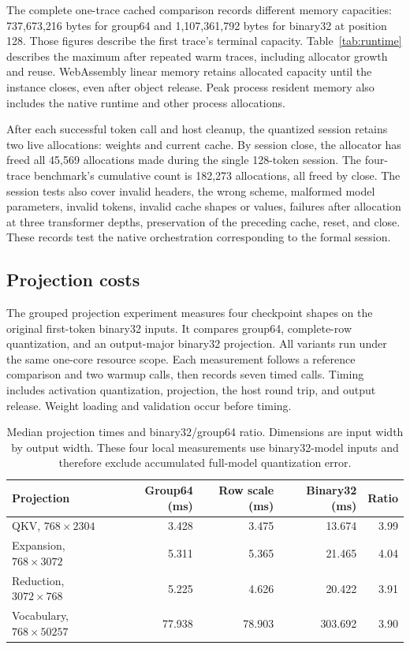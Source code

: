 The complete one-trace cached comparison records different memory capacities: 737,673,216 bytes for group64 and 1,107,361,792 bytes for binary32 at position 128.  Those figures describe the first trace's terminal capacity.  Table~\ref{tab:runtime} describes the maximum after repeated warm traces, including allocator growth and reuse.  WebAssembly linear memory retains allocated capacity until the instance closes, even after object release.  Peak process resident memory also includes the native runtime and other process allocations.

After each successful token call and host cleanup, the quantized session retains two live allocations: weights and current cache.  By session close, the allocator has freed all 45,569 allocations made during the single 128-token session.  The four-trace benchmark's cumulative count is 182,273 allocations, all freed by close.  The session tests also cover invalid headers, the wrong scheme, malformed model parameters, invalid tokens, invalid cache shapes or values, failures after allocation at three transformer depths, preservation of the preceding cache, reset, and close.  These records test the native orchestration corresponding to the formal session.

\subsection{Projection costs}

The grouped projection experiment measures four checkpoint shapes on the original first-token binary32 inputs.  It compares group64, complete-row quantization, and an output-major binary32 projection.  All variants run under the same one-core resource scope.  Each measurement follows a reference comparison and two warmup calls, then records seven timed calls.  Timing includes activation quantization, projection, the host round trip, and output release.  Weight loading and validation occur before timing.

\begin{table}[ht]
\centering
\small
\begin{tabular}{lrrrr}
\toprule
Projection & Group64 (ms) & Row scale (ms) & Binary32 (ms) & Ratio\\
\midrule
QKV, $768\times2304$ & 3.428 & 3.475 & 13.674 & 3.99\\
Expansion, $768\times3072$ & 5.311 & 5.365 & 21.465 & 4.04\\
Reduction, $3072\times768$ & 5.225 & 4.626 & 20.422 & 3.91\\
Vocabulary, $768\times50257$ & 77.938 & 78.903 & 303.692 & 3.90\\
\bottomrule
\end{tabular}
\caption{Median projection times and binary32/group64 ratio.  Dimensions are input width by output width.  These four local measurements use binary32-model inputs and therefore exclude accumulated full-model quantization error.}
\label{tab:projection}
\end{table}

